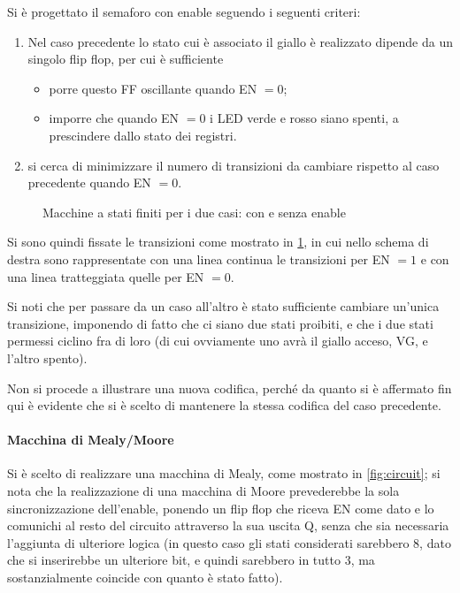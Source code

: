 \documentclass[a4paper,10pt]{article}
\begin{document}
Si è progettato il semaforo con enable seguendo i seguenti criteri:
\begin{enumerate}
	\item Nel caso precedente lo stato cui è associato il giallo è realizzato dipende da un singolo flip flop, per cui è sufficiente
	\begin{itemize}
		\item porre questo FF oscillante quando EN $ = 0 $;
		\item imporre che quando  EN $ = 0 $ i LED verde e rosso siano spenti, a prescindere dallo stato dei registri.
	\end{itemize}
	\item si cerca di minimizzare il numero di transizioni da cambiare rispetto al caso precedente quando EN $ = 0 $.
\end{enumerate}

\begin{figure}[H]
	\centering
	
	\caption{Macchine a stati finiti per i due casi: con e senza enable}
	\label{fig:EN}
\end{figure}

Si sono quindi fissate le transizioni come mostrato in \cref{fig:EN}, in cui nello schema di destra sono rappresentate con una linea continua le transizioni per EN $ = 1 $ e con una linea tratteggiata quelle per EN $ = 0 $.
\newline

Si noti che per passare da un caso all'altro è stato sufficiente cambiare un'unica transizione, imponendo di fatto che ci siano due stati proibiti, e che i due stati permessi ciclino fra di loro (di cui ovviamente uno avrà il giallo acceso, VG, e l'altro spento).
\newline

Non si procede a illustrare una nuova codifica, perché da quanto si è affermato fin qui è evidente che si è scelto di mantenere la stessa codifica del caso precedente.

\paragraph{Macchina di Mealy/Moore} Si è scelto di realizzare una macchina di Mealy, come mostrato in \cref{fig:circuit}; si nota che la realizzazione di una macchina di Moore prevederebbe la sola sincronizzazione dell'enable, ponendo un flip flop che riceva EN come dato e lo comunichi al resto del circuito attraverso la sua uscita Q, senza che sia necessaria l'aggiunta di ulteriore logica (in questo caso gli stati considerati sarebbero $ 8 $, dato che si inserirebbe un ulteriore bit, e quindi sarebbero in tutto $ 3 $, ma sostanzialmente coincide con quanto è stato fatto).
\end{document}
